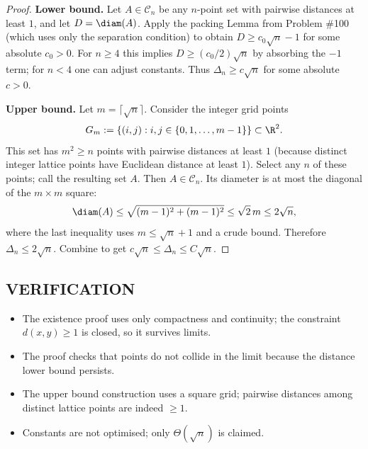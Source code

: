 \begin{proof}
\textbf{Lower bound.}
Let $A\in\mathcal{C}_n$ be any $n$-point set with pairwise distances at least $1$, and let $D=\diam(A)$.
Apply the packing Lemma from Problem \#100 (which uses only the separation condition) to obtain $D\ge c_0\sqrt{n}-1$ for some absolute $c_0>0$.
For $n\ge 4$ this implies $D\ge (c_0/2)\sqrt{n}$ by absorbing the $-1$ term; for $n<4$ one can adjust constants.
Thus $\Delta_n\ge c\sqrt{n}$ for some absolute $c>0$.

\textbf{Upper bound.}
Let $m=\lceil\sqrt{n}\rceil$.
Consider the integer grid points
\[G_m:=\{(i,j): i,j\in\{0,1,\dots,m-1\}\}\subset\R^2.
\]
This set has $m^2\ge n$ points with pairwise distances at least $1$ (because distinct integer lattice points have Euclidean distance at least $1$).
Select any $n$ of these points; call the resulting set $A$.
Then $A\in\mathcal{C}_n$.
Its diameter is at most the diagonal of the $m\times m$ square:
\[\diam(A)\le \sqrt{(m-1)^2+(m-1)^2}\le \sqrt{2}\,m \le 2\sqrt{n},
\]
where the last inequality uses $m\le \sqrt{n}+1$ and a crude bound.
Therefore $\Delta_n\le 2\sqrt{n}$.
Combine to get $c\sqrt{n}\le \Delta_n\le C\sqrt{n}$.
\end{proof}

\subsection*{VERIFICATION}
\begin{itemize}[leftmargin=2em]
\item The existence proof uses only compactness and continuity; the constraint $d(x,y)\ge 1$ is closed, so it survives limits.
\item The proof checks that points do not collide in the limit because the distance lower bound persists.
\item The upper bound construction uses a square grid; pairwise distances among distinct lattice points are indeed $\ge 1$.
\item Constants are not optimised; only $\Theta(\sqrt{n})$ is claimed.
\end{itemize}


